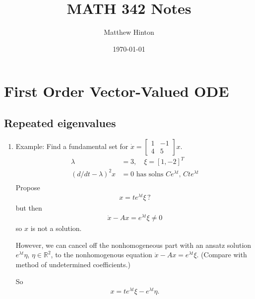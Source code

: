 \documentclass[11pt, letterpaper, oneside]{article}     %
\title{MATH 342 Notes}
\author{Matthew Hinton}
\date{\today}
\numberwithin{equation}{subsection}
\theoremstyle{definition}
\numberwithin{theorem}{section}
\theoremstyle{remark}
\newcommand{\RR}{\mathbb{R}}
\begin{document}
\maketitle

\section{First Order Vector-Valued ODE}\label{sec:first-order}

\subsection{Repeated eigenvalues}

\begin{enumerate}[itemsep=10pt]
\item Example: Find a fundamental set for
  $\dot x = \begin{bmatrix} 1 & -1 \\ 4 & 5\end{bmatrix}x$.
  \begin{align}
    \lambda &= 3,\quad \xi = [1,-2]^T\\
    (d/dt-\lambda)^2 x &= 0 \text{ has solns } Ce^{\lambda t},\, Cte^{\lambda t}\\
  \end{align}
  Propose
  \begin{align}
    x = te^{\lambda t}\xi\,?
  \end{align}
  but then
  \begin{align}
    \dot x - Ax = e^{\lambda t}\xi \neq 0
  \end{align}
  so $x$ is not a solution.

  However, we can cancel off the nonhomogeneous part with an ansatz solution $e^{\lambda t}\eta$, $\eta \in \RR^2$, to the nonhomogenous equation $\dot x - Ax = e^{\lambda t}\xi$. (Compare with method of undetermined coefficients.)

  So
  \begin{align}
    x = te^{\lambda t}\xi - e^{\lambda t}\eta.
  \end{align}


\end{enumerate}
\end{document}
